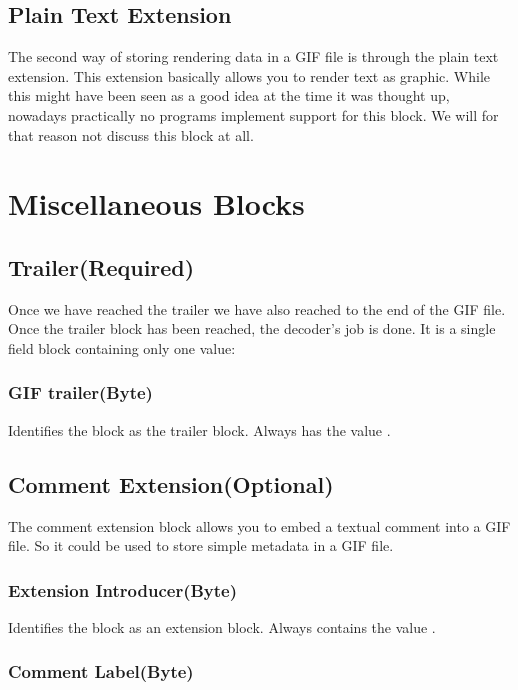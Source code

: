 \subsection{Plain Text Extension}

The second way of storing rendering data in a GIF file is through the
plain text extension. This extension basically allows you to render
text as graphic. While this might have been seen as a good idea at the
time it was thought up, nowadays practically no programs implement
support for this block. We will for that reason not discuss this
block at all.

\section{Miscellaneous Blocks}

\subsection{Trailer(Required)}

Once we have reached the trailer we have also reached to the end of
the GIF file. Once the trailer block has been reached, the decoder's
job is done. It is a single field block containing only one value:

\subsubsection{GIF trailer(Byte)}

Identifies the block as the trailer block. Always has the value
.

\subsection{Comment Extension(Optional)}

The comment extension block allows you to embed a textual comment into
a GIF file. So it could be used to store simple metadata in a GIF file.

\subsubsection{Extension Introducer(Byte)}

Identifies the block as an extension block. Always contains the
value .

\subsubsection{Comment Label(Byte)}

